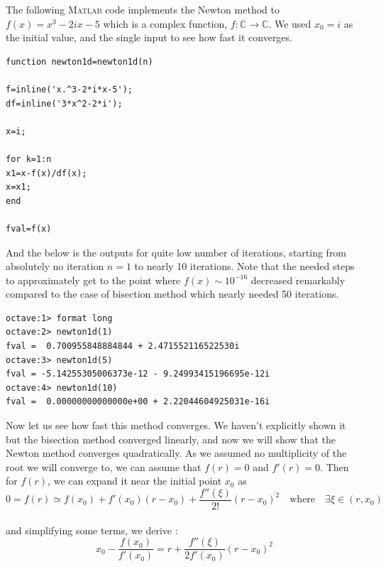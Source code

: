 \documentclass[paper=a4, fontsize=11pt]{scrartcl}
\newcommand{\MATLAB}{\textsc{Matlab}\xspace}
\begin{document}
The following \MATLAB code implements the Newton method to $f(x)=x^3 - 2ix -5 $ which is a complex function, $ f: \mathbb{C} \to \mathbb{C}$. We used $x_0=i$ as the initial value, and the single input to see how fast it converges.\\

\begin{lstlisting}[label=test.m,caption=newton1d.m]
function newton1d=newton1d(n)

f=inline('x.^3-2*i*x-5');
df=inline('3*x^2-2*i');

x=i;

for k=1:n
x1=x-f(x)/df(x);
x=x1;
end

fval=f(x)
\end{lstlisting}
\vspace{0.15in}

And the below is the outputs for quite low number of iterations, starting from absolutely no iteration $n=1$ to nearly 10 iterations. Note that the needed steps to approximately get to the point where $f(x) \sim 10^{-16}$ decreased remarkably compared to the case of bisection method which nearly needed 50 iterations.

\begin{verbatim}
octave:1> format long
octave:2> newton1d(1)
fval =  0.700955848884844 + 2.471552116522530i
octave:3> newton1d(5)
fval = -5.14255305006373e-12 - 9.24993415196695e-12i
octave:4> newton1d(10)
fval =  0.00000000000000e+00 + 2.22044604925031e-16i
\end{verbatim}

Now let us see how fast this method converges. We haven't explicitly shown it but the bisection method converged linearly, and now we will show that the Newton method converges quadratically. As we assumed no multiplicity of the root we will converge to, we can assume that $f(r)=0$ and $f'(r)=0$. Then for $f(r)$, we can expand it near the initial point $x_0$ as \\

\begin{equation}\nonumber
	0=f(r) \simeq f(x_0) + f'(x_0)(r-x_0) + \frac{f''(\xi)}{2!} (r-x_0)^2 \quad \text{where} \quad \exists\xi\in(r,x_0)
\end{equation}\\

and simplifying some terms, we derive :\\

\begin{equation}\nonumber
	x_0 - \frac{f(x_0)}{f'(x_0)} = r + \frac{f''(\xi)}{2f'(x_0)} (r-x_0)^2
\end{equation} \\
\end{document}
